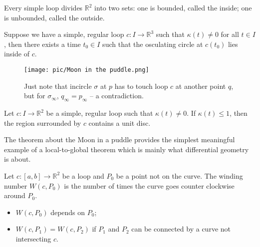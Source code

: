 \documentclass[10pt]{article}
\begin{document}
            \begin{theorem}
                Every simple loop divides $\mathbb{R}^2$ into two sets: one is bounded, called the inside; one is unbounded, called the outside.
            \end{theorem}
            \begin{lemma}
                Suppose we have a simple, regular loop $c:I\rightarrow\mathbb{R}^3$ such that $\kappa(t)\neq 0$ for all $t\in I$, then there exists a time $t_0\in I$ such that the osculating circle at $c(t_0)$ lies inside of $c$.
            \end{lemma}
            \begin{figure}[H]
                \centering
                \texttt{[image: pic/Moon in the puddle.png]}
                \caption{Just note that incircle $\sigma$ at $p$ has to touch loop $c$ at another point $q$, but for $\sigma_{\infty}$, $q_{\infty} = p_{\infty}$ -- a contradiction.}
            \end{figure}
            \begin{theorem}
                Let $c: I\rightarrow\mathbb{R}^2$ be a simple, regular loop such that $\kappa(t)\neq 0$. If $\kappa(t)\le 1$, then the region surrounded by $c$ contains a unit disc.
            \end{theorem}
            \begin{remark}
                The theorem about the Moon in a puddle provides the simplest meaningful example of a local-to-global theorem which is mainly what differential geometry is about.
            \end{remark}
            \begin{definition}
                Let $c: [a, b]\rightarrow\mathbb{R}^2$ be a loop and $P_0$ be a point not on the curve. The winding number $W(c, P_0)$ is the number of times the curve goes counter clockwise around $P_0$.
            \end{definition}
            \begin{remark}
                \begin{itemize}
                    \item $W(c, P_0)$ depends on $P_0$;
                    \item $W(c, P_1) = W(c, P_2)$ if $P_1$ and $P_2$ can be connected by a curve not intersecting $c$.
                \end{itemize}
            \end{remark}
\end{document}
